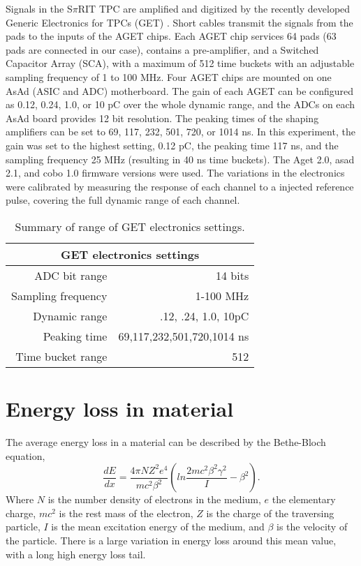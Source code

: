 Signals in the S$\pi$RIT TPC are amplified and digitized by the recently developed Generic Electronics for TPCs (GET) \cite{get}.  Short cables transmit the signals from the pads to the inputs of the AGET chips. Each AGET chip services 64 pads (63 pads are connected in our case), contains a pre-amplifier, and a Switched Capacitor Array (SCA), with a maximum of 512 time buckets with an adjustable sampling frequency of 1 to 100 MHz. Four AGET chips are mounted on one AsAd (ASIC and ADC) motherboard. The gain of each AGET can be configured as 0.12, 0.24, 1.0, or 10 pC over the whole dynamic range, and the ADCs on each AsAd board provides 12 bit resolution. The peaking times of the shaping amplifiers can be set to 69, 117, 232, 501, 720, or 1014 ns. In this experiment, the gain was set to the highest setting, 0.12 pC, the peaking time 117 ns, and the sampling frequency 25 MHz (resulting in 40 ns time buckets). The Aget 2.0, asad 2.1, and cobo 1.0 firmware versions were used. The variations in the electronics were calibrated by measuring the response of each channel to a injected reference pulse, covering the full dynamic range of each channel. 


\begin{table*}\centering
{}
\begin{tabular}{@{}rr@{}}\toprule 
\multicolumn{2}{c}{GET electronics settings}\\
\midrule
ADC bit range       & 14 bits \\
Sampling frequency  & 1-100 MHz \\
Dynamic range       & .12, .24, 1.0, 10pC \\
Peaking time        & 69,117,232,501,720,1014 ns \\
Time bucket range   & 512\\
\bottomrule
\end{tabular}
\caption{Summary of range of GET electronics settings. }
\label{tb:getoverview}
\end{table*}


\section{Energy loss in material}
The average energy loss in a material can be described by the Bethe-Bloch equation,
\begin{equation}\label{eq:bb}
\frac{dE}{dx} = \frac{4\pi NZ^2e^4}{mc^2\beta^2} (ln \frac{2mc^2\beta^2\gamma^2}{I} - \beta^2).
\end{equation}
Where $N$ is the number density of electrons in the medium, $e$ the elementary charge, $mc^2$ is the rest mass of the electron, $Z$ is the charge of the traversing particle, $I$ is the mean excitation energy of the medium, and $\beta$ is the velocity of the particle. There is a large variation in energy loss around this mean value, with a long high energy loss tail. 

